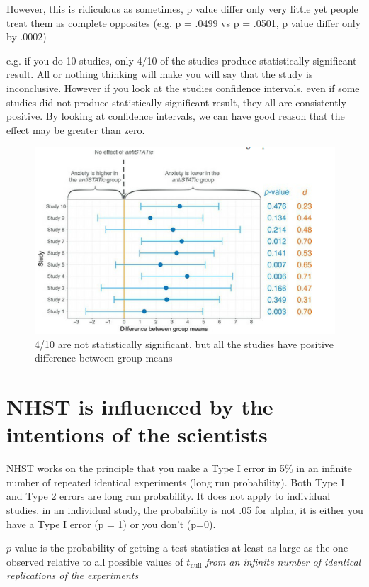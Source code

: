 However, this is ridiculous as sometimes, p value differ only very little yet people treat them as complete opposites (e.g. p = .0499 vs p = .0501, p value differ only by .0002)

e.g. if you do 10 studies, only 4/10 of the studies produce statistically significant result. All or nothing thinking will make you will say that the study is inconclusive. However if you look at the studies confidence intervals, even if some studies did not produce statistically significant result, they all are consistently positive. By looking at confidence intervals, we can have good reason that the effect may be greater than zero.

\begin{figure}[h]
	\includegraphics{Chapter 3 Pheonix of Statistics/confidenceinterval.PNG}
	\caption{4/10 are not statistically significant, but all the studies have positive difference between group means}
\end{figure}

\section{NHST is influenced by the intentions of the scientists}

NHST works on the principle that you make a Type I error in 5\% in an infinite number of repeated identical experiments (long run probability).
Both Type I and Type 2 errors are long run probability. It does not apply to individual studies. in an individual study, the probability is not .05 for alpha, it is either you have a Type I error (p = 1) or you don't (p=0).

\begin{center}
$p$-value is the probability of getting a test statistics at least as large as the one observed relative to all possible values of $t_{\text{null}}$ \emph{from an infinite number of identical replications of the experiments}
\end{center}

